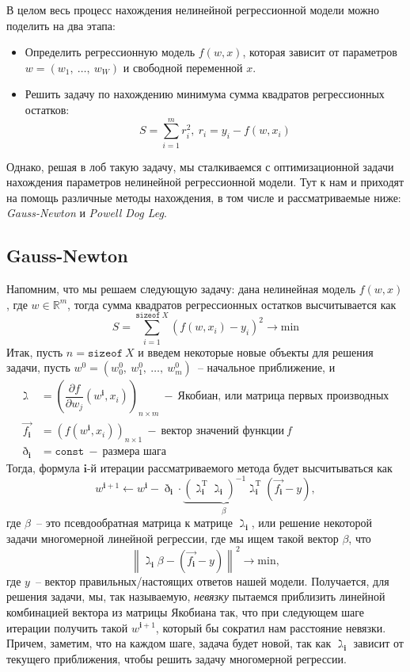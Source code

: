 \documentclass[12pt, a4paper, oneside, final]{article}
\begin{document}
	В целом весь процесс нахождения нелинейной регрессионной модели можно поделить на два этапа:
	\begin{itemize}
		\item Определить регрессионную модель $f(w, x)$, которая зависит от параметров $w = (w_{1}, ~ \ldots, ~ w_{W})$ и свободной переменной $x$.
		\item Решить задачу по нахождению минимума сумма квадратов регрессионных остатков:
		\[
			S = \sum\limits_{i = 1}^{m}{r_{i}^{2}}, ~ r_{i} = y_{i} - f(w, x_{i})
		\]
	\end{itemize}
	Однако, решая в лоб такую задачу, мы сталкиваемся с оптимизационной задачи нахождения параметров нелинейной регрессионной модели.
	Тут к нам и приходят на помощь различные методы нахождения, в том числе и рассматриваемые ниже: \textit{Gauss-Newton} и \textit{Powell Dog Leg}.
	\subsection*{Gauss-Newton}
	Напомним, что мы решаем следующую задачу: дана нелинейная модель $f(w, x)$, где $w \in \mathbb{R}^{m}$, тогда сумма квадратов регрессионных остатков высчитывается как
	\[
		S = \sum\limits_{i = 1}^{\texttt{sizeof}~X}{(f(w, x_{i}) - y_{i})^2} \to \mathrm{min}
	\]
	Итак, пусть $n = \texttt{sizeof}~X$ и введем некоторые новые объекты для решения задачи, пусть $w^{0} = (w_{0}^{0}, ~ w_{1}^{0}, ~ \ldots, ~ w^{0}_{m})$~-- начальное приближение, и
	\begin{align*}
		\gimel &= \left(\dfrac{\partial{f}}{\partial{w_{j}}}{(w^{\mathbf{i}}, x_{i})}\right)_{n \times m}~-~\text{Якобиан, или матрица первых производных} \\
		\vec{f_{\mathbf{i}}} &= \left(f(w^{\mathbf{i}}, x_{i})\right)_{n \times 1}~-~\text{вектор значений функции}~f \\
		\eth_{\mathbf{i}} &= \texttt{const}~-~\text{размера шага}
	\end{align*}
	Тогда, формула $\mathbf{i}$-й итерации рассматриваемого метода будет высчитываться как
	\[
		w^{\mathbf{i} + 1} \gets w^{\mathbf{i}} - \eth_{\mathbf{i}} \cdot \underbrace{\left(\gimel^{\mathrm{T}}_{\mathbf{i}}\gimel_{\mathbf{i}}\right)^{-1}\gimel_{\mathbf{i}}^{\mathrm{T}}}_{\beta}(\vec{f_{\mathbf{i}}} - y),
	\] где $\beta$~-- это псевдообратная матрица к матрице $\gimel_{\mathbf{i}}$, или решение некоторой задачи многомерной линейной регрессии, где мы ищем такой вектор $\beta$, что
	\[
		\left\|\gimel_{\mathbf{i}}\beta - (\vec{f_{\mathbf{i}}} - y)\right\|^{2} \to \mathrm{min},
	\] где $y$~-- вектор правильных/настоящих ответов нашей модели.
	Получается, для решения задачи, мы, так называемую, \textit{невязку} пытаемся приблизить линейной комбинацией вектора из матрицы Якобиана так, что при следующем шаге итерации получить такой $w^{\mathbf{i} + 1}$, который бы сократил нам расстояние невязки.
	Причем, заметим, что на каждом шаге, задача будет новой, так как $\gimel_{\mathbf{i}}$ зависит от текущего приближения, чтобы решить задачу многомерной регрессии.
\end{document}

